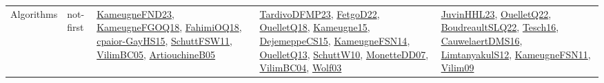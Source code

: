 {\begin{longtable}{lp{3cm}>{\raggedright}p{6cm}>{\raggedright}p{6cm}p{8cm}}
Algorithms & not-first & \href{papers/KameugneFND23.pdf}{KameugneFND23}\cite{KameugneFND23}, \href{papers/KameugneFGOQ18.pdf}{KameugneFGOQ18}\cite{KameugneFGOQ18}, \href{articles/FahimiOQ18.pdf}{FahimiOQ18}\cite{FahimiOQ18}, \href{papers/cpaior-GayHS15.pdf}{cpaior-GayHS15}\cite{cpaior-GayHS15}, \href{articles/SchuttFSW11.pdf}{SchuttFSW11}\cite{SchuttFSW11}, \href{articles/VilimBC05.pdf}{VilimBC05}\cite{VilimBC05}, \href{papers/ArtiouchineB05.pdf}{ArtiouchineB05}\cite{ArtiouchineB05} & \href{papers/TardivoDFMP23.pdf}{TardivoDFMP23}\cite{TardivoDFMP23}, \href{articles/FetgoD22.pdf}{FetgoD22}\cite{FetgoD22}, \href{papers/OuelletQ18.pdf}{OuelletQ18}\cite{OuelletQ18}, \href{articles/Kameugne15.pdf}{Kameugne15}\cite{Kameugne15}, \href{papers/DejemeppeCS15.pdf}{DejemeppeCS15}\cite{DejemeppeCS15}, \href{articles/KameugneFSN14.pdf}{KameugneFSN14}\cite{KameugneFSN14}, \href{papers/OuelletQ13.pdf}{OuelletQ13}\cite{OuelletQ13}, \href{papers/SchuttW10.pdf}{SchuttW10}\cite{SchuttW10}, \href{papers/MonetteDD07.pdf}{MonetteDD07}\cite{MonetteDD07}, \href{papers/VilimBC04.pdf}{VilimBC04}\cite{VilimBC04}, \href{papers/Wolf03.pdf}{Wolf03}\cite{Wolf03} & \href{papers/JuvinHHL23.pdf}{JuvinHHL23}\cite{JuvinHHL23}, \href{papers/OuelletQ22.pdf}{OuelletQ22}\cite{OuelletQ22}, \href{papers/BoudreaultSLQ22.pdf}{BoudreaultSLQ22}\cite{BoudreaultSLQ22}, \href{papers/Tesch16.pdf}{Tesch16}\cite{Tesch16}, \href{papers/CauwelaertDMS16.pdf}{CauwelaertDMS16}\cite{CauwelaertDMS16}, \href{articles/LimtanyakulS12.pdf}{LimtanyakulS12}\cite{LimtanyakulS12}, \href{papers/KameugneFSN11.pdf}{KameugneFSN11}\cite{KameugneFSN11}, \href{papers/Vilim09.pdf}{Vilim09}\cite{Vilim09}\\

\end{longtable}}
